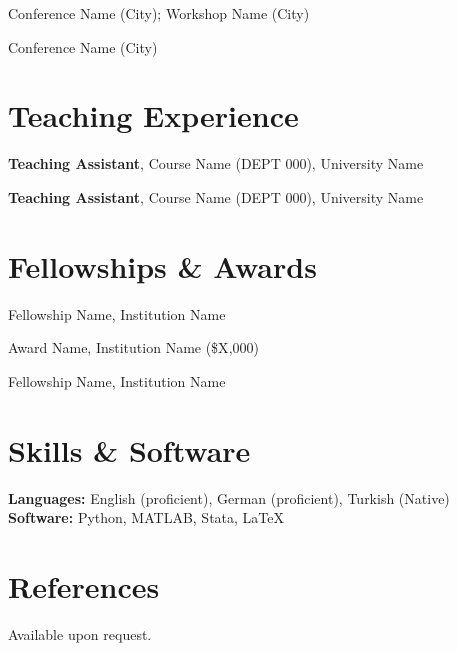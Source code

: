 \documentclass[11pt]{article}
\newlength{\cvdatecol}
\newenvironment{cventries}{%
    \begin{list}{}{%
            \setlength{\leftmargin}{\cvdatecol}%
            \setlength{\labelwidth}{\dimexpr\cvdatecol-0.5em\relax}%
            \setlength{\labelsep}{0.5em}%
            \setlength{\topsep}{2pt}%
            \setlength{\itemsep}{5pt}%
            \setlength{\parsep}{0pt}%
        }%
    }{
\end{list}}
\newcommand{\cventry}[2]{%
\item[\hfill\small\textit{#1}] #2%
}
\begin{document}
\begin{cventries}
    \cventry{2024}{Conference Name (City); Workshop Name (City)}
    \cventry{2023}{Conference Name (City)}
\end{cventries}

\section{Teaching Experience}

\begin{cventries}
    \cventry{Spring 2024}{%
        \textbf{Teaching Assistant}, Course Name (DEPT 000), University Name
    }
    \cventry{Fall 2023}{%
        \textbf{Teaching Assistant}, Course Name (DEPT 000), University Name
    }
\end{cventries}

\section{Fellowships \& Awards}

\begin{cventries}
    \cventry{2023}{Fellowship Name, Institution Name}
    \cventry{2022}{Award Name, Institution Name (\$X{,}000)}
    \cventry{2020}{Fellowship Name, Institution Name}
\end{cventries}

\section{Skills \& Software}

\textbf{Languages:} English (proficient), German (proficient), Turkish (Native) \\
\textbf{Software:} Python, MATLAB, Stata, \LaTeX{}

\section{References}

Available upon request.
\end{document}
